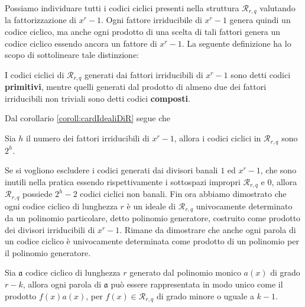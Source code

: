 \noindent
Possiamo individuare tutti i codici ciclici presenti nella struttura $\mathcal{R}_{r, q}$ valutando la fattorizzazione di $x^r-1$. Ogni fattore irriducibile di $x^r - 1$ genera quindi un codice ciclico, ma anche ogni prodotto di una scelta di tali fattori genera un codice ciclico essendo ancora un fattore di $x^r - 1$. La seguente definizione ha lo scopo di sottolineare tale distinzione:
\begin{definizione}
   I codici ciclici di $\mathcal{R}_{r, q}$ generati dai fattori irriducibili di $x^r-1$ sono detti codici {\bf primitivi}, mentre quelli generati dal prodotto di almeno due dei fattori irriducibili non triviali sono detti codici {\bf composti}.
\end{definizione}
\noindent
Dal corollario \ref{coroll:cardIdealiDiR} segue che
\begin{corollario}
   Sia $h$ il numero dei fattori irriducibili di $x^r - 1$, allora i codici ciclici in $\mathcal{R}_{r, q}$ sono $2^h$.
\end{corollario}
\noindent
Se si vogliono escludere i codici generati dai divisori banali $1$ ed $x^r -1$, che sono inutili nella pratica essendo rispettivamente i sottospazi impropri $\mathcal{R}_{r, q}$ e $0$, allora $\mathcal{R}_{r, q}$ possiede $2^h - 2$ codici ciclici non banali.
Fin ora abbiamo dimostrato che ogni codice ciclico di lunghezza $r$ è un ideale di $\mathcal{R}_{r, q}$ univocamente determinato da un polinomio particolare, detto polinomio generatore, costruito come prodotto dei divisori irriducibili di $x^r - 1$. Rimane da dimostrare che anche ogni parola di un codice ciclico è univocamente determinata come prodotto di un polinomio per il polinomio generatore.
\begin{teorema}
   Sia $\mathfrak{a}$ codice ciclico di lunghezza $r$ generato dal polinomio monico $a(x)$ di grado $r-k$, allora ogni parola di $\mathfrak{a}$ può essere rappresentata in modo unico come il prodotto $f(x)a(x)$, per $f(x) \in \mathcal{R}_{r, q}$ di grado minore o uguale a $k-1$.
\end{teorema}
